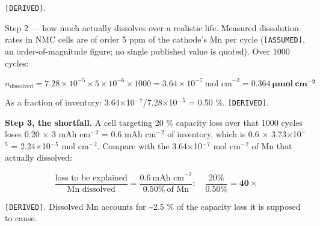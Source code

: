 \documentclass[11pt,a4paper]{article}
\begin{document}
\texttt{[DERIVED]}.


Step 2 --- how much actually dissolves over a realistic life. Measured dissolution rates in NMC cells are of order 5 ppm of the cathode's Mn per cycle (\texttt{[ASSUMED]}, an order-of-magnitude figure; no single published value is quoted). Over 1000 cycles:


\begin{equation}n_{\text{dissolved}} = 7.28\times10^{-5}\times5\times10^{-6}\times1000 = 3.64\times10^{-7}\ \text{mol cm}^{-2} = \mathbf{0.364\ \mu mol\ cm^{-2}} \tag{S2.14}\end{equation}


As a fraction of inventory: 3.64\ensuremath{\times}10\ensuremath{^{-}}\ensuremath{^{7}}/7.28\ensuremath{\times}10\ensuremath{^{-}}\ensuremath{^{5}} = 0.50 \%. \texttt{[DERIVED]}.


\textbf{Step 3, the shortfall.} A cell targeting 20 \% capacity loss over that 1000 cycles loses 0.20 \ensuremath{\times} 3 mAh cm\ensuremath{^{-}}\ensuremath{^{2}} = 0.6 mAh cm\ensuremath{^{-}}\ensuremath{^{2}} of inventory, which is 0.6 \ensuremath{\times} 3.73\ensuremath{\times}10\ensuremath{^{-}}\ensuremath{^{5}} = 2.24\ensuremath{\times}10\ensuremath{^{-}}\ensuremath{^{5}} mol cm\ensuremath{^{-}}\ensuremath{^{2}}. Compare with the 3.64\ensuremath{\times}10\ensuremath{^{-}}\ensuremath{^{7}} mol cm\ensuremath{^{-}}\ensuremath{^{2}} of Mn that actually dissolved:


\begin{equation}\frac{\text{loss to be explained}}{\text{Mn dissolved}} = \frac{0.6\ \text{mAh cm}^{-2}}{0.50\%\ \text{of Mn}}:\quad \frac{20\%}{0.50\%} = \mathbf{40\times} \tag{S2.15}\end{equation}


\texttt{[DERIVED]}. Dissolved Mn accounts for \textasciitilde{}2.5 \% of the capacity loss it is supposed to cause.
\end{document}
